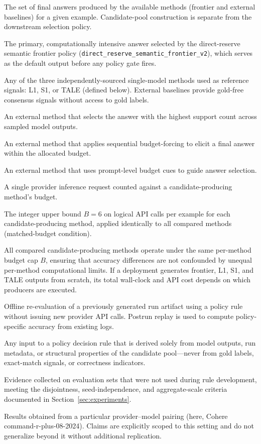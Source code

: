 \begin{description}[leftmargin=2.2cm, labelwidth=2cm, labelsep=0.2cm, style=nextline]
  \item[Candidate pool] The set of final answers produced by the available methods (frontier and external baselines) for a given example. Candidate-pool construction is separate from the downstream selection policy.
  \item[Frontier method] The primary, computationally intensive answer selected by the direct-reserve semantic frontier policy (\texttt{direct\_reserve\_semantic\_frontier\_v2}), which serves as the default output before any policy gate fires.
  \item[External baseline] Any of the three independently-sourced single-model methods used as reference signals: L1, S1, or TALE (defined below). External baselines provide gold-free consensus signals without access to gold labels.
  \item[L1] An external method that selects the answer with the highest support count across sampled model outputs.
  \item[S1] An external method that applies sequential budget-forcing to elicit a final answer within the allocated budget.
  \item[TALE] An external method that uses prompt-level budget cues to guide answer selection.
  \item[Logical API call] A single provider inference request counted against a candidate-producing method's budget.
  \item[Budget] The integer upper bound $B = 6$ on logical API calls per example for each candidate-producing method, applied identically to all compared methods (matched-budget condition).
  \item[Matched budget] All compared candidate-producing methods operate under the same per-method budget cap $B$, ensuring that accuracy differences are not confounded by unequal per-method computational limits. If a deployment generates frontier, L1, S1, and TALE outputs from scratch, its total wall-clock and API cost depends on which producers are executed.
  \item[Postrun replay] Offline re-evaluation of a previously generated run artifact using a policy rule without issuing new provider API calls. Postrun replay is used to compute policy-specific accuracy from existing logs.
  \item[Gold-free runtime feature] Any input to a policy decision rule that is derived solely from model outputs, run metadata, or structural properties of the candidate pool---never from gold labels, exact-match signals, or correctness indicators.
  \item[Held-out evaluation evidence] Evidence collected on evaluation sets that were not used during rule development, meeting the disjointness, seed-independence, and aggregate-scale criteria documented in Section~\ref{sec:experiments}.
  \item[Provider-specific evidence] Results obtained from a particular provider--model pairing (here, Cohere command-r-plus-08-2024). Claims are explicitly scoped to this setting and do not generalize beyond it without additional replication.
\end{description}
